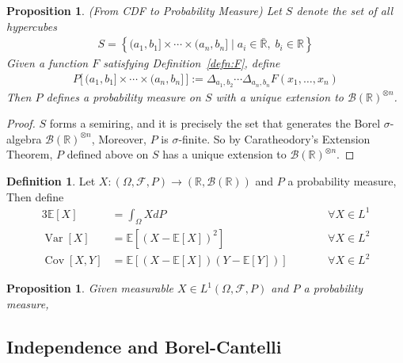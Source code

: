 \documentclass[12pt]{article}
\theoremstyle{plain}
\newtheorem{prop}[thm]{Proposition}
\theoremstyle{definition}
\newtheorem{defn}[thm]{Definition}
\theoremstyle{remark}
\newcommand{\ra}{\rightarrow}
\newcommand{\sF}{\mathscr{F}}
\newcommand{\sB}{\mathscr{B}}
\newcommand{\R}{\mathbb{R}}
\newcommand{\E}{\mathbb{E}}
\newcommand{\Cov}{\operatorname{Cov}}
\newcommand{\Var}{\operatorname{Var}}
\begin{document}
\begin{prop}\emph{(From CDF to Probability Measure)}
Let $S$ denote the set of all hypercubes
\begin{align*}
  S = \left\{ (a_1,b_1]\times\cdots\times(a_n,b_n]
  \;|\; a_i\in\bar{\R}, \; b_i\in\R\right\}
\end{align*}
Given a function $F$ satisfying Definition~\ref{defn:F}, define
\begin{align*}
  P\big[\, (a_1,b_1]\times\cdots\times(a_n,b_n] \,\big] :=
  \Delta_{a_1,b_2}
  \cdots
  \Delta_{a_n,b_n}
  F(x_1,\ldots,x_n)
\end{align*}
Then $P$ defines a probability measure on $S$ with a unique extension to
$\sB(\R)^{\otimes n}$.
\end{prop}
\begin{proof}
$S$ forms a semiring, and it is precisely the set that generates the
Borel $\sigma$-algebra $\sB(\R)^{\otimes n}$, Moreover, $P$ is
$\sigma$-finite. So by Caratheodory's Extension Theorem, $P$ defined
above on $S$ has a unique extension to $\sB(\R)^{\otimes n}$.
\end{proof}


\begin{defn}
Let $X:(\Omega,\sF,P)\ra (\R,\sB(\R))$ and $P$ a probability measure,
Then define
\begin{alignat*}{3}
  \E[X] &= \int_\Omega X dP &&\forall X\in L^1\\
  \Var[X] &= \E[(X-\E[X])^2]  &&\forall X\in L^2\\
  \Cov[X,Y] &= \E[(X-\E[X])(Y-\E[Y])] \qquad&&\forall X\in L^2
\end{alignat*}
\end{defn}

\begin{prop}
Given measurable $X\in L^1(\Omega,\sF,P)$ and $P$ a probability measure,
\end{prop}


\subsection{Independence and Borel-Cantelli}
\end{document}
